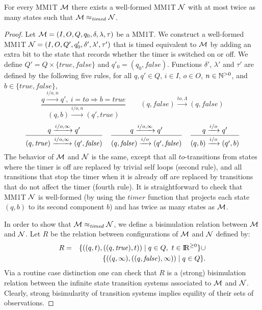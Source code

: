 \begin{theorem}
For every MM1T ${\cal M}$ there exists a well-formed MM1T ${\cal N}$ with at most twice as many states such that 
${\cal M} \approx_{\mathit{timed}} {\cal N}$.
\end{theorem}
\begin{proof}
Let ${\cal M} = (I, O, Q, q_0, \delta, \lambda, \tau)$ be a MM1T. 
We construct a well-formed MM1T ${\cal N}= (I, O, Q', q'_0, \delta', \lambda', \tau')$ that is timed equivalent to ${\cal M}$ 
by adding an extra bit to the state that records whether the timer is switched on or off.
We define $Q' = Q \times \{ \mathit{true}, \mathit{false} \}$ and $q'_0 = (q_0, \mathit{false})$.
Functions $\delta'$, $\lambda'$ and $\tau'$ are defined by the following five rules,
for all $q, q' \in Q$, $i \in I$, $o \in O$, $n \in {\mathbb N}^{>0}$, and $b \in \{ \mathit{true}, \mathit{false} \}$,
\[
\frac{q \xrightarrow{i/o, n} q' ,~ i = \mathit{to} \Rightarrow b = \mathit{true}}
{(q,b) \xrightarrow{i/o, n} (q', \mathit{true})} \hspace{2em}
(q, \mathit{false}) \xrightarrow {\mathit{to}, \Lambda} (q, \mathit{false})
\]
\[
\frac{q \xrightarrow{i/o, \infty} q'}{(q, \mathit{true}) \xrightarrow{i/o, \infty} (q', \mathit{false})} \hspace{1em}
\frac{q \xrightarrow{i/o, \infty} q'}{(q, \mathit{false}) \xrightarrow{i/o} (q', \mathit{false})} \hspace{1 em}
\frac{q \xrightarrow{i/o} q'}{(q, b) \xrightarrow{i/o} (q', b)}
\]
The behavior of ${\cal M}$ and ${\cal N}$ is the same,
except that all $\mathit{to}$-transitions from states where the timer is off are replaced by trivial self loops (second rule),
and all transitions that stop the timer when it is already off are replaced by transitions that do not affect the timer (fourth rule).
It is straightforward to check that MM1T ${\cal N}$ is well-formed (by using
the $\mathit{timer}$ function that projects each state $(q, b)$ to its second component $b$)
and has twice as many states as ${\cal M}$.

In order to show that ${\cal M} \approx_{\mathit{timed}} {\cal N}$, we define a bisimulation relation between ${\cal M}$ and ${\cal N}$.
Let $R$ be the relation between configurations of ${\cal M}$ and ${\cal N}$ defined by:
\begin{eqnarray*}
R & = & \{ ((q,t), ((q, \mathit{true}), t)) \mid q \in Q,~ t \in {\rm I\!R}^{\geq 0} \} \cup\\
& & \{ ((q,\infty), ((q, \mathit{false}), \infty)) \mid q \in Q \}.
\end{eqnarray*}
Via a routine case distinction one can check that $R$ is a (strong) bisimulation relation between the infinite 
state transition systems associated to ${\cal M}$ and ${\cal N}$.
Clearly, strong bisimularity of transition systems implies equility of their sets of observations.
\end{proof}

